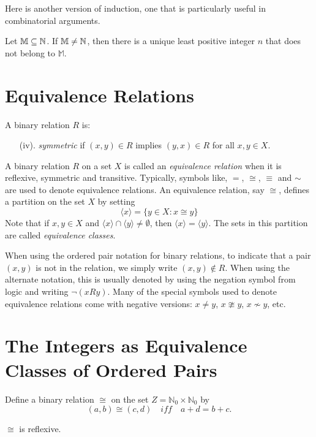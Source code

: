 Here is another version of induction, one that is particularly useful
in combinatorial arguments.

\begin{theorem}
Let $\mathbb{M}\subseteq\mathbb{N}$.  If $\mathbb{M}\neq\mathbb{N}$,
then there is a unique least positive integer $n$ that does not
belong to $\mathbb{M}$.
\end{theorem}

\section{Equivalence Relations}\label{sec:numsys:equivalence}

A binary relation $R$ is:

\begin{enumerate}
\item[(iv).] \textit{symmetric} if $(x,y)\in R$ implies $(y,x)\in R$ for
all $x,y\in X$.
\end{enumerate}

A binary relation $R$ on a set $X$ is called an
\textit{equivalence relation} when it is reflexive, symmetric
and transitive.  Typically, symbols like, $=$, $\cong$,
$\equiv$ and $\sim$ are used to
denote equivalence relations.  An equivalence relation, say
$\cong$, defines
a partition on the set $X$ by setting
\[
\langle x\rangle =\{y\in X: x\cong y\}
\]
Note that if $x,y\in X$ and $\langle x\rangle\cap\langle y\rangle
\neq\emptyset$, then $\langle x\rangle=\langle y\rangle$.
The sets in this partition are called \textit{equivalence classes}.

When using the ordered pair notation for binary relations,
to indicate that a pair $(x,y)$ is not in the relation,
we simply write $(x,y)\notin R$. When using the alternate
notation, this is usually denoted by using the negation
symbol from logic and writing $\lnot (xRy)$.  Many of the
special symbols used to denote equivalence relations
come with negative versions: $x\neq y$, $x\ncong y$,
$x\nsim y$, etc.

\section{The Integers as Equivalence Classes of Ordered Pairs}\label{s:integers}

Define a binary relation $\cong$ on the set $Z=\mathbb{N}_0
 \times\mathbb{N}_0$ by
\[
(a,b)\cong (c,d)\quad\textit{iff}\quad a+d=b+c.
\]

\begin{lemma}
$\cong$ is reflexive.
\end{lemma}

